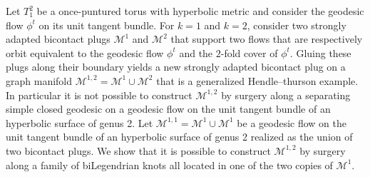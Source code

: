 \documentclass{amsart}
\theoremstyle{definition}
\theoremstyle{remark}
\begin{document}
Let $T_1^2$ be a once-puntured torus with hyperbolic metric and consider the geodesic flow $\phi^t$ on its unit tangent bundle. For $k=1$ and $k=2$, consider two strongly adapted bicontact plugs $\mathcal{M}^1$ and $\mathcal{M}^2$ that support two flows that are respectively orbit equivalent to the geodesic flow $\phi^t$ and the $2$-fold cover of $\phi^t$. Gluing these plugs along their boundary yields a new strongly adapted bicontact plug on a graph manifold $\mathcal{M}^{1,2}=\mathcal{M}^1\cup \mathcal{M}^2$ that is a generalized Hendle--thurson example. In particular it is not possible to construct $\mathcal{M}^{1,2}$ by surgery along a separating simple closed geodesic on a geodesic flow on the unit tangent bundle of an hyperbolic surface of genus 2. Let  $\mathcal{M}^{1,1}=\mathcal{M}^1\cup \mathcal{M}^1$ be a geodesic flow on the unit tangent bundle of an hyperbolic surface of genus 2 realized as the union of two bicontact plugs. We show that it is possible to construct $\mathcal{M}^{1,2}$ by surgery along a family of biLegendrian knots all located in one of the two copies of $\mathcal{M}^1$.  
\end{document}
